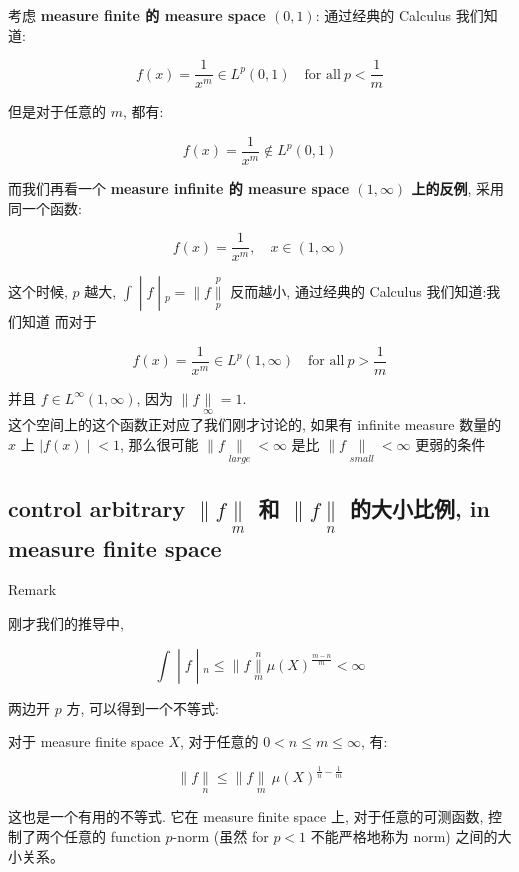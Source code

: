 \begin{example}

考虑 \textbf{measure finite 的 measure space \((0,1)\)}: 通过经典的 Calculus 我们知道:

\[f(x) = \frac{1}{x^{m}} \in L^{p}(0,1)\quad\text{for all}\ p < \frac{1}{m}\]

但是对于任意的 \(m\), 都有:

\[f(x) = \frac{1}{x^{m}} \notin L^{p}(0,1)\]

而我们再看一个 \textbf{measure infinite 的 measure space \((1,\infty)\) 上的反例}, 采用同一个函数:

\[f(x) = \frac{1}{x^{m}},\quad x \in (1,\infty)\]

这个时候, \(p\) 越大, \(\left. \int \middle| f \middle| {}_{p} = \parallel f\underset{p}{\overset{p}{\parallel}} \right.\) 反而越小, 通过经典的 Calculus 我们知道:我们知道 而对于

\[f(x) = \frac{1}{x^{m}} \in L^{p}(1,\infty)\quad\text{for all}\ p > \frac{1}{m}\]

并且 \(f \in L^{\infty}(1,\infty)\), 因为 \(\parallel f\underset{\infty}{\parallel} = 1\).\\
这个空间上的这个函数正对应了我们刚才讨论的, 如果有 infinite measure 数量的 \(x\) 上 \(\left. |f(x) \middle| < 1 \right.\), 那么很可能 \(\parallel f\underset{large}{\parallel} < \infty\) 是比 \(\parallel f\underset{small}{\parallel} < \infty\) 更弱的条件

\end{example}

\subsection{\texorpdfstring{control arbitrary \(\parallel f\underset{m}{\parallel}\) 和 \(\parallel f\underset{n}{\parallel}\) 的大小比例, in measure finite space}{control arbitrary \textbackslash parallel f\textbackslash underset\{m\}\{\textbackslash parallel\} 和 \textbackslash parallel f\textbackslash underset\{n\}\{\textbackslash parallel\} 的大小比例, in measure finite space}}

\begin{qlremark}{Remark}

刚才我们的推导中,

\[\left. \int \middle| f \middle| {}_{n} \leq \parallel f\underset{m}{\overset{n}{\parallel}}\mu(X)^{\frac{m - n}{m}} < \infty \right.\]

两边开 \(p\) 方, 可以得到一个不等式:

\begin{theorem}

对于 measure finite space \(X\), 对于任意的 \(0 < n \leq m \leq \infty\), 有:

\[\parallel f\underset{n}{\parallel} \leq \parallel f\underset{m}{\parallel}\,\mu(X)^{\frac{1}{n} - \frac{1}{m}}\]

\end{theorem}

这也是一个有用的不等式. 它在 measure finite space 上, 对于任意的可测函数, 控制了两个任意的 function \(p\)-norm (虽然 for \(p < 1\) 不能严格地称为 norm) 之间的大小关系。

\end{qlremark}


